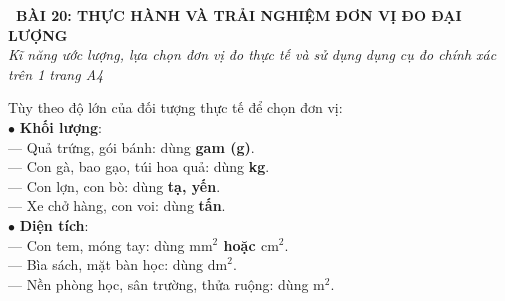 \documentclass[14pt,a4paper,oneside]{extbook}
\begin{document}
\noindent
\begin{tcolorbox}[
  enhanced,
  colback=teal!8!white,
  colframe=teal!80!black,
  arc=3mm, boxrule=1pt,
  left=3mm, right=3mm, top=2mm, bottom=2mm,
  halign=center
]
  {\Large\bfseries\color{teal!90!black}\faBookmark\ BÀI 20: THỰC HÀNH VÀ TRẢI NGHIỆM ĐƠN VỊ ĐO ĐẠI LƯỢNG}\\[1.5pt]
  {\footnotesize\itshape\color{black!75} Kĩ năng ước lượng, lựa chọn đơn vị đo thực tế và sử dụng dụng cụ đo chính xác trên 1 trang A4}
\end{tcolorbox}

\vspace{2mm}

\noindent
\begin{minipage}[t]{0.49\textwidth}
  \begin{tcolorbox}[
    enhanced,
    title={\footnotesize\bfseries\color{white}\faBalanceScale\ 1. Lựa chọn đơn vị đo phù hợp},
    colback=blue!2!white,
    colframe=blue!75!black,
    arc=2.5mm, boxrule=0.8pt, top=1.8mm, bottom=1.8mm, left=2mm, right=2mm
  ]
    \footnotesize
    Tùy theo độ lớn của đối tượng thực tế để chọn đơn vị:\\
    $\bullet$ \textbf{Khối lượng}:\\
    --- Quả trứng, gói bánh: dùng \textbf{gam (g)}.\\
    --- Con gà, bao gạo, túi hoa quả: dùng \textbf{kg}.\\
    --- Con lợn, con bò: dùng \textbf{tạ, yến}.\\
    --- Xe chở hàng, con voi: dùng \textbf{tấn}.\\
    $\bullet$ \textbf{Diện tích}:\\
    --- Con tem, móng tay: dùng \textbf{$\text{mm}^2$ hoặc $\text{cm}^2$}.\\
    --- Bìa sách, mặt bàn học: dùng \textbf{$\text{dm}^2$}.\\
    --- Nền phòng học, sân trường, thửa ruộng: dùng \textbf{$\text{m}^2$}.
  \end{tcolorbox}
\end{minipage}%
\hfill
\end{document}

